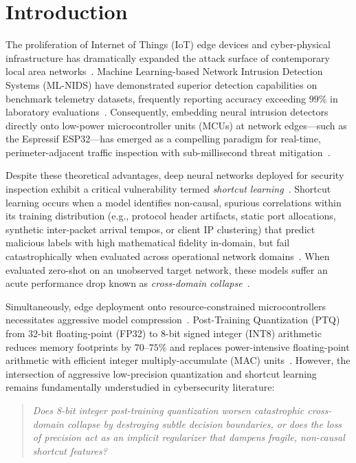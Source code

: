 \section{Introduction}
\label{sec:intro}

The proliferation of Internet of Things (IoT) edge devices and cyber-physical infrastructure has dramatically expanded the attack surface of contemporary local area networks~\cite{apruzzese2023role}. Machine Learning-based Network Intrusion Detection Systems (ML-NIDS) have demonstrated superior detection capabilities on benchmark telemetry datasets, frequently reporting accuracy exceeding $99\%$ in laboratory evaluations~\cite{ring2019survey}. Consequently, embedding neural intrusion detectors directly onto low-power microcontroller units (MCUs) at network edges—such as the Espressif ESP32—has emerged as a compelling paradigm for real-time, perimeter-adjacent traffic inspection with sub-millisecond threat mitigation~\cite{david2021tensorflow, banbury2021benchmarking}.

Despite these theoretical advantages, deep neural networks deployed for security inspection exhibit a critical vulnerability termed \emph{shortcut learning}~\cite{geirhos2020shortcut, arp2022dos}. Shortcut learning occurs when a model identifies non-causal, spurious correlations within its training distribution (e.g., protocol header artifacts, static port allocations, synthetic inter-packet arrival tempos, or client IP clustering) that predict malicious labels with high mathematical fidelity in-domain, but fail catastrophically when evaluated across operational network domains~\cite{sommer2010outside}. When evaluated zero-shot on an unobserved target network, these models suffer an acute performance drop known as \emph{cross-domain collapse}~\cite{sarhan2023standard}.

Simultaneously, edge deployment onto resource-constrained microcontrollers necessitates aggressive model compression~\cite{warden2019tinyml}. Post-Training Quantization (PTQ) from 32-bit floating-point (FP32) to 8-bit signed integer (INT8) arithmetic reduces memory footprints by $70\text{--}75\%$ and replaces power-intensive floating-point arithmetic with efficient integer multiply-accumulate (MAC) units~\cite{jacob2018quantization, gholami2022survey}. However, the intersection of aggressive low-precision quantization and shortcut learning remains fundamentally understudied in cybersecurity literature:
\begin{quote}
\emph{Does 8-bit integer post-training quantization worsen catastrophic cross-domain collapse by destroying subtle decision boundaries, or does the loss of precision act as an implicit regularizer that dampens fragile, non-causal shortcut features?}
\end{quote}

